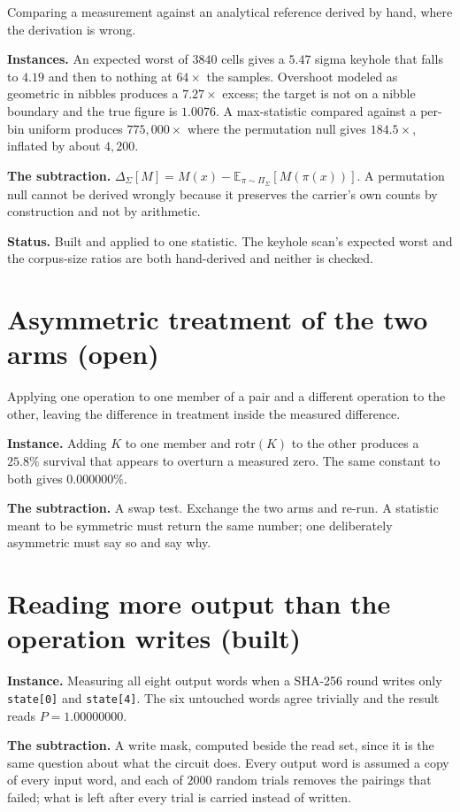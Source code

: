 Comparing a measurement against an analytical reference derived by hand, where the derivation is wrong.

\textbf{Instances.} An expected worst of \(3840\) cells gives a \(5.47\) sigma keyhole that falls to \(4.19\) and then to nothing at \(64\times\) the samples. Overshoot modeled as geometric in nibbles produces a \(7.27\times\) excess; the target is not on a nibble boundary and the true figure is \(1.0076\). A max-statistic compared against a per-bin uniform produces \(775{,}000\times\) where the permutation null gives \(184.5\times\), inflated by about \(4{,}200\).

\textbf{The subtraction.} \(\Delta_\Sigma[M] = M(x) - \mathbb{E}_{\pi \sim \Pi_\Sigma}[M(\pi(x))]\). A permutation null cannot be derived wrongly because it preserves the carrier's own counts by construction and not by arithmetic.

\textbf{Status.} Built and applied to one statistic. The keyhole scan's expected worst and the corpus-size ratios are both hand-derived and neither is checked.

\section{Asymmetric treatment of the two arms (open)}

Applying one operation to one member of a pair and a different operation to the other, leaving the difference in treatment inside the measured difference.

\textbf{Instance.} Adding \(K\) to one member and \(\mathrm{rotr}(K)\) to the other produces a \(25.8\%\) survival that appears to overturn a measured zero. The same constant to both gives \(0.000000\%\).

\textbf{The subtraction.} A swap test. Exchange the two arms and re-run. A statistic meant to be symmetric must return the same number; one deliberately asymmetric must say so and say why.

\section{Reading more output than the operation writes (built)}

\textbf{Instance.} Measuring all eight output words when a SHA-256 round writes only \texttt{state[0]} and \texttt{state[4]}. The six untouched words agree trivially and the result reads \(P = 1.00000000\).

\textbf{The subtraction.} A write mask, computed beside the read set, since it is the same question about what the circuit does. Every output word is assumed a copy of every input word, and each of \(2000\) random trials removes the pairings that failed; what is left after every trial is carried instead of written.

